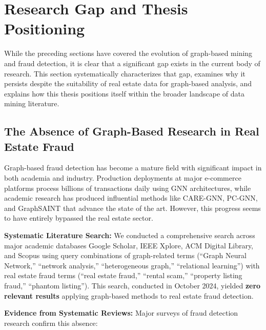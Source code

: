 \section{Research Gap and Thesis Positioning}
\label{sec:2_8}

While the preceding sections have covered the evolution of graph-based mining and fraud detection, it is clear that a significant gap exists in the current body of research. This section systematically characterizes that gap, examines why it persists despite the suitability of real estate data for graph-based analysis, and explains how this thesis positions itself within the broader landscape of data mining literature.

\subsection{The Absence of Graph-Based Research in Real Estate Fraud}

Graph-based fraud detection has become a mature field with significant impact in both academia and industry. Production deployments at major e-commerce platforms process billions of transactions daily using GNN architectures, while academic research has produced influential methods like CARE-GNN, PC-GNN, and GraphSAINT that advance the state of the art. However, this progress seems to have entirely bypassed the real estate sector.

\textbf{Systematic Literature Search:} We conducted a comprehensive search across major academic databases Google Scholar, IEEE Xplore, ACM Digital Library, and Scopus using query combinations of graph-related terms (``Graph Neural Network,'' ``network analysis,'' ``heterogeneous graph,'' ``relational learning'') with real estate fraud terms (``real estate fraud,'' ``rental scam,'' ``property listing fraud,'' ``phantom listing''). This search, conducted in October 2024, yielded \textbf{zero relevant results} applying graph-based methods to real estate fraud detection.

\textbf{Evidence from Systematic Reviews:} Major surveys of fraud detection research confirm this absence:

